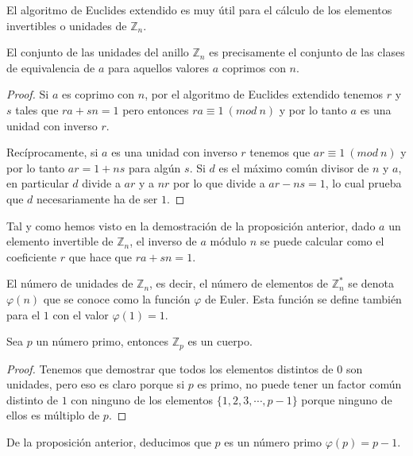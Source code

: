 El algoritmo de Euclides extendido es muy \'util para el c\'alculo de los elementos invertibles o unidades de ${\mathbb Z}_n$.

\begin{proposition}
El conjunto de las unidades del anillo ${\mathbb Z}_n$ es precisamente el
conjunto de las clases de equivalencia de $a$ para aquellos valores $a$ coprimos con $n$.
\end{proposition}
\begin{proof}
Si $a$ es coprimo con $n$, por el algoritmo de Euclides extendido tenemos $r$ y
$s$ tales que $ra+sn = 1$ pero entonces $ra \equiv 1 ~(mod~n)$ y por lo tanto
$a$ es una unidad con inverso $r$.

Rec\'iprocamente, si $a$ es una unidad con inverso $r$ tenemos que $ar \equiv
1~(mod~n)$ y por lo tanto $ar = 1 + ns$ para alg\'un $s$. Si $d$ es el m\'aximo
com\'un divisor de $n$ y $a$, en particular $d$ divide a $ar$ y a $nr$ por lo
que divide a $ar-ns = 1$, lo cual prueba que $d$ necesariamente ha de ser $1$.
\end{proof}

\begin{remark}
Tal y como hemos visto en la demostraci\'on de la proposici\'on anterior,
dado $a$ un elemento invertible de ${\mathbb Z}_n$, el inverso de $a$ m\'odulo
$n$ se puede calcular como el coeficiente $r$ que hace que $ra+sn=1$.
\end{remark}

\begin{definition}
El n\'umero de unidades de ${\mathbb Z}_n$, es decir, el n\'umero de elementos de
${\mathbb Z}_n^*$ se denota $\varphi(n)$ que se conoce como la funci\'on
$\varphi$ de Euler. Esta funci\'on se define tambi\'en para el $1$ con el
valor $\varphi(1) = 1$.
\end{definition}

\begin{proposition}
Sea $p$ un n\'umero primo, entonces ${\mathbb Z}_p$ es un cuerpo.
\end{proposition}
\begin{proof}
Tenemos que demostrar que todos los elementos distintos de $0$ son unidades,
pero eso es claro porque si $p$ es primo, no puede tener un factor com\'un distinto de $1$ con ninguno de los elementos $\{1,2,3,\cdots,p-1\}$ porque ninguno de ellos es m\'ultiplo de $p$.
\end{proof}

\begin{remark}
De la proposici\'on anterior, deducimos que $p$ es un n\'umero primo $\varphi(p) = p-1$.
\end{remark}

